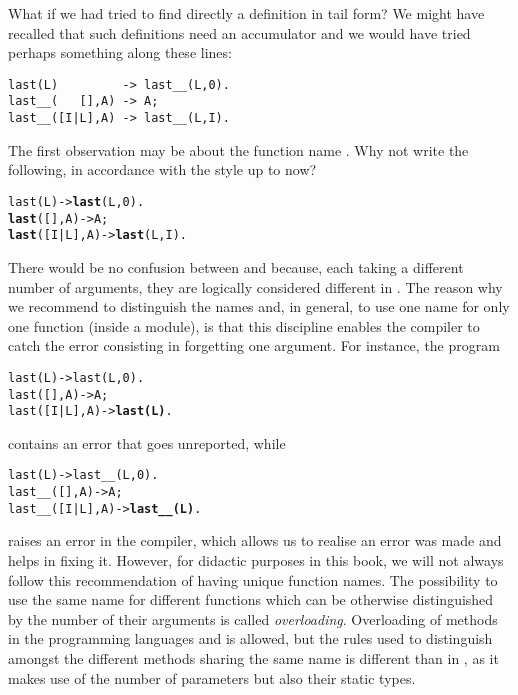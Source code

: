 What if we had tried to find directly a definition in tail form? We
might have recalled that such definitions need an accumulator and we
would have tried perhaps something along these lines:
\begin{verbatim}
last(L)         -> last__(L,0).
last__(   [],A) -> A;
last__([I|L],A) -> last__(L,I).
\end{verbatim}
The first observation may be about the function name
. Why not write the following, in accordance with
the style up to now?
\begin{alltt}
last(L)       -> \textbf{last}(L,0).
\textbf{last}(   [],A) -> A;
\textbf{last}([I|L],A) -> \textbf{last}(L,I).
\end{alltt}
There would be no confusion between  and
 because, each taking a different number of arguments,
they are logically considered different in \Erlang. The reason why we
recommend to distinguish the names and, in general, to use one name
for only one function (inside a module), is that this discipline
enables the compiler to catch the error consisting in forgetting one
argument. For instance, the program
\begin{alltt}
last(L)       -> last(L,0).
last(   [],A) -> A;
last([I|L],A) -> \textbf{last(L)}.\hfill% \emph{Argument silently missing}
\end{alltt}
contains an error that goes unreported, while
\begin{alltt}
last(L)         -> last__(L,0).
last__(   [],A) -> A;
last__([I|L],A) -> \textbf{last\_\_(L)}.\hfill% \emph{Error reported}
\end{alltt}
raises an error in the compiler, which allows us to realise an error
was made and helps in fixing it. However, for didactic purposes in
this book, we will not always follow this recommendation of having
unique function names. The possibility to use the same name for
different functions which can be otherwise distinguished by the number
of their arguments is called \emph{overloading}. Overloading of
methods in the programming languages \Java and \Cpp is allowed, but
the rules used to distinguish amongst the different methods sharing
the same name is different than in \Erlang, as it makes use of the
number of parameters but also their static types.

